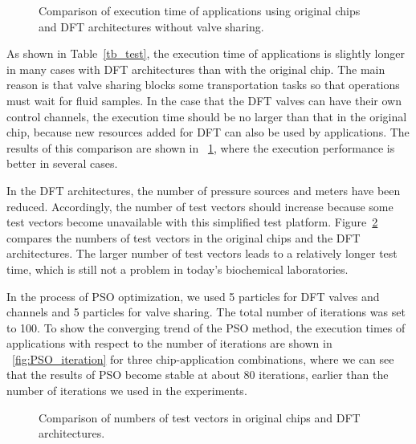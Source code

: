

\begin{figure}[t]
{
\figurefontsize
\centering

%
\caption{Comparison of execution time of applications 
using original chips and DFT architectures without valve sharing.}
\label{fig:exetime_cmp}
}
\end{figure}


As shown in Table~\ref{tb_test}, the execution time of applications is slightly
longer in many cases with DFT architectures than with the original chip.  The
main reason is that valve sharing blocks some transportation tasks so that
operations must wait for fluid samples. In the case that the DFT
valves can have their own control channels, the execution time should be no
larger than that in the original chip, because new resources added for DFT can
also be used by applications.  The results of this comparison are shown in
\figname~\ref{fig:exetime_cmp}, where the execution performance is better in
several cases.

In the DFT architectures, the number of pressure sources and meters have been
reduced. Accordingly, the number of test vectors should increase because some
test vectors become unavailable with this simplified test platform.
Figure~\ref{fig:testvector_cmp} compares the numbers of test vectors in the
original chips and the DFT architectures.  The larger number of test vectors
leads to a relatively longer test time, which is still not a problem in today's biochemical
laboratories. 

In the process of PSO optimization, we used 5 particles for DFT valves and
channels and 5 particles for valve sharing. The total number of iterations was
set to 100. To show the converging trend of the PSO method, the execution times
of applications with respect to the number of iterations are shown in 
\figname~\ref{fig:PSO_iteration} for three chip-application combinations,
where we can see that the results of PSO become stable at about 80 iterations,
earlier than the number of iterations we used in the experiments.

\begin{figure}[t]
{
\figurefontsize
\centering

%
\caption{Comparison of numbers of test vectors 
  in original chips and DFT architectures.} 
  \label{fig:testvector_cmp}
}
\end{figure}

